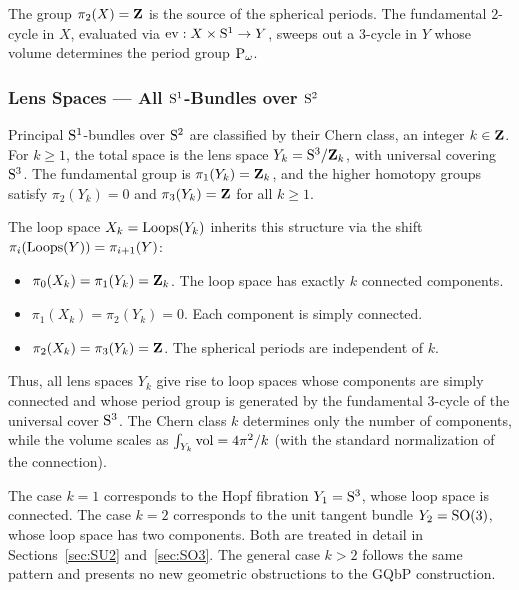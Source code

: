 \documentclass[11pt,reqno,letterpaper,twoside]{amsart}
\begin{document}
  The group $\pi_2(X) = {\mathbf{Z}}$ is the source of the spherical periods.
  The fundamental $2$-cycle in $X$,
  evaluated via ${\operatorname{ev}}: X \times \mathrm{S}^1 \to Y$,
  sweeps out a $3$-cycle in $Y$
  whose volume determines the period group $\operatorname{P}_\omega$.
  
  \subsubsection{Lens Spaces --- All $\mathrm{S}^1$-Bundles over $\mathrm{S}^2$}
  
  Principal $\mathrm{S}^1$-bundles over $\mathrm{S}^2$ are classified by their Chern class,
  an integer $k \in {\mathbf{Z}}$.
  For $k \geq 1$,
  the total space is the lens space $Y_k = \mathrm{S}^3 / {\mathbf{Z}}_k$,
  with universal covering $\mathrm{S}^3$.
  The fundamental group is $\pi_1(Y_k) = {\mathbf{Z}}_k$,
  and the higher homotopy groups satisfy
  $\pi_2(Y_k) = 0$ and
  $\pi_3(Y_k) = {\mathbf{Z}}$ for all $k \geq 1$.
  
  The loop space $X_k = \operatorname{Loops}(Y_k)$ inherits this structure
  via the shift $\pi_i(\operatorname{Loops}(Y)) = \pi_{i+1}(Y)$:
  \begin{itemize}[nosep]
    \item[--] $\pi_0(X_k) = \pi_1(Y_k) = {\mathbf{Z}}_k$.
    The loop space has exactly $k$ connected components.
    \item[--] $\pi_1(X_k) = \pi_2(Y_k) = 0$.
    Each component is simply connected.
    \item[--] $\pi_2(X_k) = \pi_3(Y_k) = {\mathbf{Z}}$.
    The spherical periods are independent of $k$.
  \end{itemize}
  
  Thus,
  all lens spaces $Y_k$ give rise to loop spaces
  whose components are simply connected
  and whose period group is generated by
  the fundamental $3$-cycle of the universal cover $\mathrm{S}^3$.
  The Chern class $k$ determines only the number of components,
  while the volume scales as $\int_{Y_k} \mathrm{vol} = 4\pi^2/k$
  (with the standard normalization of the connection).
  
  The case $k = 1$ corresponds to the Hopf fibration $Y_1 = \mathrm{S}^3$,
  whose loop space is connected.
  The case $k = 2$ corresponds to the unit tangent bundle
  $Y_2 = \mathrm{SO}(3)$,
  whose loop space has two components.
  Both are treated in detail in Sections~\ref{sec:SU2} and~\ref{sec:SO3}.
  The general case $k > 2$ follows the same pattern
  and presents no new geometric obstructions to the GQbP construction.
  
\end{document}
